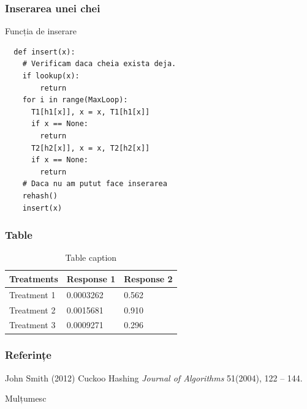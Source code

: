 \documentclass{beamer}
\begin{document}
\begin{frame}[fragile]
\frametitle{Inserarea unei chei}
\begin{block}{Funcția de inserare}
\begin{lstlisting}
  def insert(x):
  	# Verificam daca cheia exista deja.
  	if lookup(x):
  		return
   	for i in range(MaxLoop):
   	  T1[h1[x]], x = x, T1[h1[x]]
   	  if x == None:
   	    return
   	  T2[h2[x]], x = x, T2[h2[x]]
   	  if x == None:
   	    return
   	# Daca nu am putut face inserarea
   	rehash()
   	insert(x)
\end{lstlisting}
\end{block}

\end{frame}

\begin{frame}
\frametitle{Table}
\begin{table}
\begin{tabular}{l l l}
\toprule
\textbf{Treatments} & \textbf{Response 1} & \textbf{Response 2}\\
\midrule
Treatment 1 & 0.0003262 & 0.562 \\
Treatment 2 & 0.0015681 & 0.910 \\
Treatment 3 & 0.0009271 & 0.296 \\
\bottomrule
\end{tabular}
\caption{Table caption}
\end{table}
\end{frame}

\begin{frame}
\frametitle{Referințe}
\footnotesize{
\begin{thebibliography}{99} %
 John Smith (2012)
\newblock Cuckoo Hashing
\newblock \emph{Journal of Algorithms} 51(2004), 122 -- 144.
\end{thebibliography}
}
\end{frame}


\begin{frame}
\Huge{\centerline{Mulțumesc}}
\end{frame}

\end{document}
